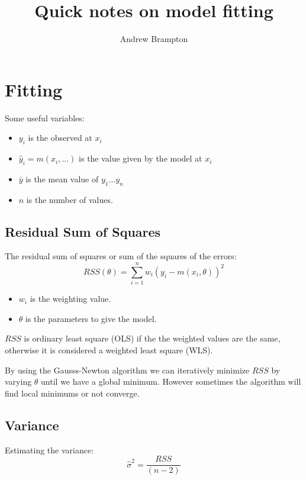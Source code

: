 \documentclass[a4paper]{sig-alternate}
\author{Andrew Brampton}
\date{}
\begin{document}
\title{Quick notes on model fitting}
\maketitle

\section{Fitting}
Some useful variables:

\begin{itemize}
  \item $y_{i}$ is the observed at $x_{i}$
  \item $\hat{y}_{i} = m(x_{i},...)$ is the value given by the model at $x_{i}$
  \item $\bar{y}$ is the mean value of $y_{1}...y_{n}$
  \item $n$ is the number of values.
\end{itemize}

\subsection{Residual Sum of Squares}
The residual sum of squares or sum of the squares of the errors:
\begin{displaymath}
    RSS(\theta) = \sum_{i=1}^n w_{i}(y_{i} - m(x_{i}, \theta))^{2}
\end{displaymath}

\begin{itemize}
  \item $w_{i}$ is the weighting value.
  \item $\theta$ is the parameters to give the model.
\end{itemize}

$RSS$ is ordinary least square (OLS) if the the weighted values are the same, otherwise it is considered a weighted least square (WLS).

By using the Gausss-Newton algorithm we can iteratively minimize $RSS$ by varying $\theta$ until we have a global minimum. However sometimes the algorithm will find local minimums or not converge.

\subsection{Variance}
Estimating the variance:
\begin{displaymath}
    \hat{\sigma}^{2} = \frac{RSS}{ ( n - 2 ) }
\end{displaymath}
\end{document}
